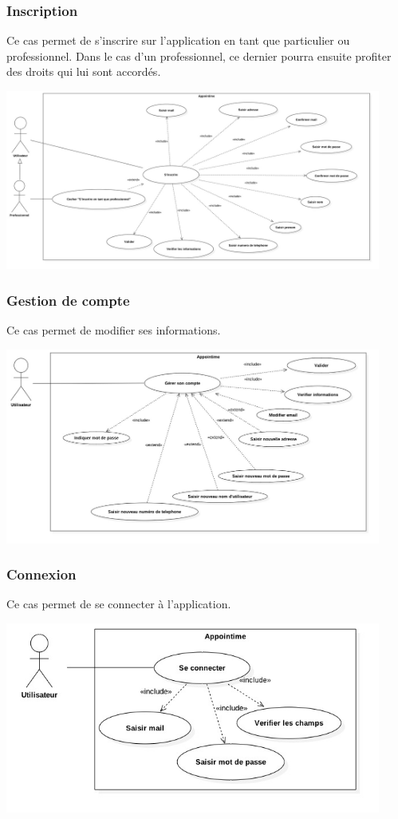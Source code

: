 \documentclass{article}
\begin{document}
\subsubsection{Inscription}
Ce cas permet de s'inscrire sur l'application en tant que particulier ou professionnel.
Dans le cas d'un professionnel, ce dernier pourra ensuite profiter des droits qui lui sont accordés.

\begin{center}
  \includegraphics[width=350pt]{diagram/useCaseInsc}
\end{center}


\subsubsection{Gestion de compte}
Ce cas permet de modifier ses informations.
\begin{center}
  \includegraphics[width=350pt]{diagram/useCaseGererCompte}
\end{center}

\subsubsection{Connexion}
Ce cas permet de se connecter à l'application.
\begin{center}
  \includegraphics[width=350pt]{diagram/useCaseConnexion}
\end{center}
\end{document}
